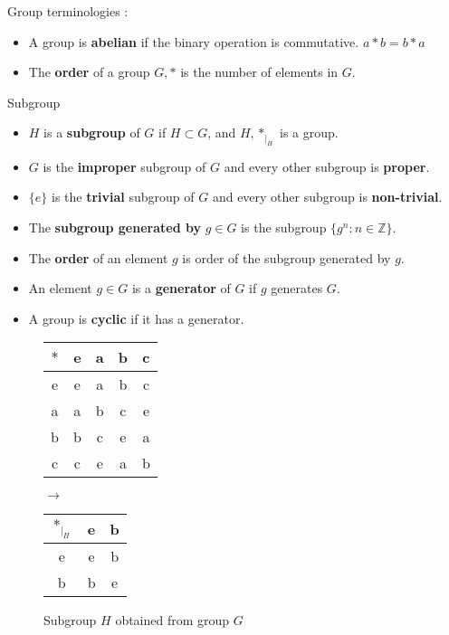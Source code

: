 \begin{definition}Group terminologies :
	\begin{itemize}
		\item A group is \textbf{abelian} if the binary operation is commutative. $a \ast b = b \ast a$ %
		\item The \textbf{order} of a group $G,\ast$ is the number of elements in $G$.%
	\end{itemize}
\end{definition}

\begin{definition} Subgroup
	\begin{itemize}
		\item $H$ is a \textbf{subgroup} of $G$ if $H \subset G$, and $H,\ast_{|_H}$ is a group. %
		\item $G$ is the \textbf{improper} subgroup of $G$ and every other subgroup is \textbf{proper}.%
		\item $\{e\}$ is the \textbf{trivial} subgroup of $G$ and every other subgroup is \textbf{non-trivial}.%
		\item The \textbf{subgroup generated by} $g \in G$ is the subgroup $\{ g^n : n \in \mathbb{Z} \}$.%
		\item The \textbf{order} of an element $g$ is order of the subgroup generated by $g$.%
		\item An element $g \in G$ is a \textbf{generator} of $G$ if $g$ generates $G$.%
		\item A group is \textbf{cyclic} if it has a generator.%
	\end{itemize}
\end{definition}

\begin{figure}[h]
	\centering
	\begin{tabular}{c|cccc}
		 $\ast$  & e & a & b & c \\ \hline
		 e & e & a & b & c \\
		 a & a & b & c & e \\
		 b & b & c & e & a \\
		 c & c & e & a & b
	\end{tabular}
	$\to$
	\begin{tabular}{c|cc}
		$\ast_{|_H}$  & e & b \\ \hline
		 e & e & b \\
		 b & b & e
	\end{tabular}
	\caption{Subgroup $H$ obtained from group $G$}
\end{figure}

